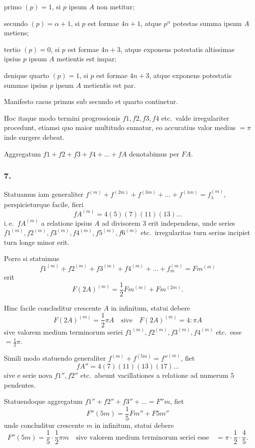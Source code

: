 \documentclass[12pt,a4paper]{article}
\begin{document}
primo $(p)=1$, si $p$ ipsum $A$ non metitur;

secundo $(p)=\alpha+1$, si $p$ est formae $4n+1$, atque $p^\alpha$ potestas summa ipsum $A$ metiens;

tertio $(p)=0$, si $p$ est formae $4n+3$, atque exponens potestatis altissimae ipsius $p$ ipsum $A$ metientis est impar;

denique quarto $(p)=1$, si $p$ est formae $4n+3$, atque exponens potestatis summae ipsius $p$ ipsum $A$ metientis est par.

Manifesto casus primus sub secundo et quarto continetur.

Hoc itaque modo termini progressionis $f1, f2, f3, f4$ etc.\ valde irregulariter procedunt, etiamsi quo maior multitudo sumatur, eo accuratius valor medius $=\pi$ inde surgere debeat.

Aggregatum $f1+f2+f3+f4+\ldots+fA$ denotabimus per $FA$.

\subsubsection*{7.}

Statuamus iam generaliter $f^{(m)}+f^{(2m)}+f^{(3m)}+\ldots+f^{(\lambda m)} = f_\lambda^{(m)}$, perspicieturque facile, fieri
\[
fA^{(m)} = 4(5)(7)(11)(13)\ldots
\]
i.\,e.\ $fA^{(m)}$ a relatione ipsius $A$ ad divisorem $3$ erit independens, unde series $f1^{(m)}, f2^{(m)}, f3^{(m)}, f4^{(m)}, f5^{(m)}, f6^{(m)}$ etc.\ irregularitas turn serius incipiet turn longe minor erit.

Porro si statuimus
\[
f1^{(m)}+f2^{(m)}+f3^{(m)}+f4^{(m)}+\ldots+f_m^{(m)} = Fm^{(m)}
\]
erit
\[
F(2A)^{(m)} = \frac{1}{2}Fm^{(m)} + Fm^{(2m)}.
\]

Hinc facile concluditur crescente $A$ in infinitum, statui debere
\[
F(2A)^{(m)} = \frac{1}{2}\pi A \quad\text{sive}\quad F(2A)^{(m)} = 4:\pi A
\]
sive valorem medium terminorum seriei $f1^{(m)}, f2^{(m)}, f3^{(m)}, f4^{(m)}$ etc.\ esse $=\frac{1}{2}\pi$.

Simili modo statuendo generaliter $f^{(m)}+f^{(5m)}=f''^{(m)}$, fiet
\[
fA'' = 4(7)(11)(13)(17)\ldots
\]
sive e serie nova $f1'', f2''$ etc.\ abeunt vacillationes a relatione ad numerum $5$ pendentes.

Statuendoque aggregatum $f1''+f2''+f3''+\ldots = F''m$, fiet
\[
F''(5m) = \frac{1}{5}Fm'' + F5m''
\]
unde concluditur crescente $m$ in infinitum, statui debere
\[
F''(5m) = \frac{1}{5}\cdot\frac{1}{2}\pi m \quad\text{sive valorem medium terminorum seriei esse}\quad = \pi\cdot\frac{1}{2}\cdot\frac{4}{5}.
\]
\end{document}
